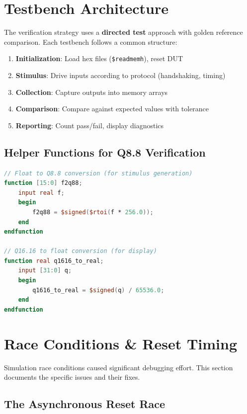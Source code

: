 \documentclass[11pt,a4paper]{report}
\begin{document}
\section{Testbench Architecture}

The verification strategy uses a \textbf{directed test} approach with golden reference comparison. Each testbench follows a common structure:

\begin{enumerate}[leftmargin=2em]
    \item \textbf{Initialization}: Load hex files (\texttt{\$readmemh}), reset DUT
    \item \textbf{Stimulus}: Drive inputs according to protocol (handshaking, timing)
    \item \textbf{Collection}: Capture outputs into memory arrays
    \item \textbf{Comparison}: Compare against expected values with tolerance
    \item \textbf{Reporting}: Count pass/fail, display diagnostics
\end{enumerate}

\subsection{Helper Functions for Q8.8 Verification}

\begin{lstlisting}[language=Verilog, caption={Testbench helper functions}]
// Float to Q8.8 conversion (for stimulus generation)
function [15:0] f2q88;
    input real f;
    begin
        f2q88 = $signed($rtoi(f * 256.0));
    end
endfunction

// Q16.16 to float conversion (for display)
function real q1616_to_real;
    input [31:0] q;
    begin
        q1616_to_real = $signed(q) / 65536.0;
    end
endfunction
\end{lstlisting}

\section{Race Conditions \& Reset Timing}

Simulation race conditions caused significant debugging effort. This section documents the specific issues and their fixes.

\subsection{The Asynchronous Reset Race}
\end{document}
